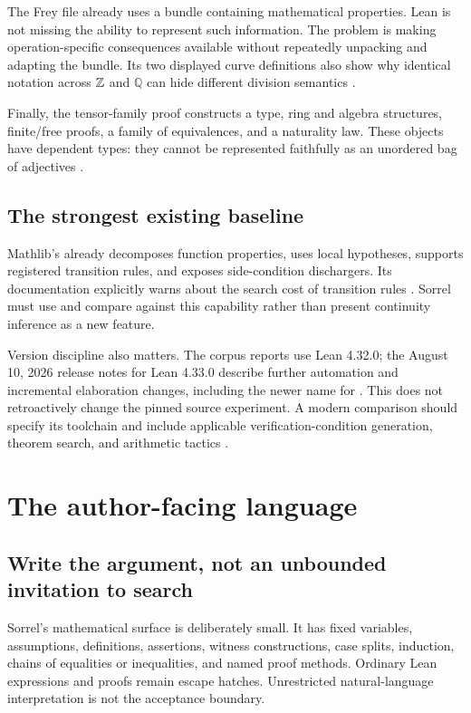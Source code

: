 \documentclass[11pt,a4paper]{article}
\newcommand{\code}[1]{\texttt{\detokenize{#1}}}
\newcommand{\Q}{\mathbb Q}\newcommand{\R}{\mathbb R}\newcommand{\C}{\mathbb C}
\numberwithin{equation}{section}
\theoremstyle{definition}\newtheorem{definition}[theorem]{Definition}
\theoremstyle{remark}\newtheorem{remark}[theorem]{Remark}
\begin{document}
The Frey file already uses a bundle containing mathematical properties.
Lean is not missing the ability to represent such information. The problem is
making operation-specific consequences available without repeatedly
unpacking and adapting the bundle. Its two displayed curve definitions also
show why identical notation across \(\mathbb Z\) and \(\Q\) can hide different division
semantics \cite{frey}.

Finally, the tensor-family proof constructs a type, ring and algebra
structures, finite/free proofs, a family of equivalences, and a naturality
law. These objects have dependent types: they cannot be represented faithfully
as an unordered bag of adjectives \cite{tensor}.

\subsection{The strongest existing baseline}
Mathlib's \code{fun_prop} already decomposes function properties, uses local
hypotheses, supports registered transition rules, and exposes side-condition
dischargers. Its documentation explicitly warns about the search cost of
transition rules \cite{funprop}. Sorrel must use and compare against this
capability rather than present continuity inference as a new feature.

Version discipline also matters. The corpus reports use Lean 4.32.0; the
August 10, 2026 release notes for Lean 4.33.0 describe further automation and
incremental elaboration changes, including the newer \code{vcgen} name for
\code{mvcgen'}. This does not retroactively change the pinned source experiment.
A modern comparison should specify its toolchain and include applicable
verification-condition generation, theorem search, and arithmetic tactics
\cite{lean433}.

\section{The author-facing language}\label{sec:surface}

\subsection{Write the argument, not an unbounded invitation to search}
Sorrel's mathematical surface is deliberately small. It has fixed variables,
assumptions, definitions, assertions, witness constructions, case splits,
induction, chains of equalities or inequalities, and named proof methods.
Ordinary Lean expressions and proofs remain escape hatches. Unrestricted
natural-language interpretation is not the acceptance boundary.
\end{document}
